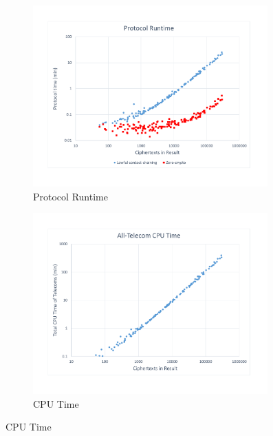 \begin{figure}[t]
\centering
\begin{subfigure}{.33\textwidth}
\centering
\includegraphics[width=0.99\textwidth]{runtime.pdf}
\captionsetup{justification=centering}
\caption{Protocol Runtime}
\label{fig:runtime}
\end{subfigure}\hfill
\begin{subfigure}{.33\textwidth}
\centering
\includegraphics[width=0.99\textwidth]{cputime.pdf}
\captionsetup{justification=centering}
\caption{CPU Time}
\label{fig:cputime}
\end{subfigure}\hfill

\end{figure}
